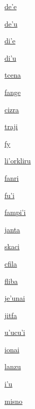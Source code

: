 {\hyperlink{val:dehe}{de'e}}{}{}{}

{\hyperlink{val:dehu}{de'u}}{}{}{}

{\hyperlink{val:dihe}{di'e}}{}{}{}

{\hyperlink{val:dihu}{di'u}}{}{}{}

{\hyperlink{val:tcena}{tcena}}{}{}{}

{\hyperlink{val:fange}{fange}}{}{}{}

{\hyperlink{val:cizra}{cizra}}{}{}{}

{\hyperlink{val:traji}{traji}}{}{}{}

{\hyperlink{val:fy}{fy}}{}{}{}

{\hyperlink{val:lihorkliru}{li'orkliru}}{}{}{}

{\hyperlink{val:fanri}{fanri}}{}{}{}

{\hyperlink{val:fuhi}{fu'i}}{}{}{}

{\hyperlink{val:fampihi}{fampi'i}}{}{}{}

{\hyperlink{val:janta}{janta}}{}{}{}

{\hyperlink{val:skaci}{skaci}}{}{}{}

{\hyperlink{val:cfila}{cfila}}{}{}{}

{\hyperlink{val:fliba}{fliba}}{}{}{}

{\hyperlink{val:jehunai}{je'unai}}{}{}{}

{\hyperlink{val:jitfa}{jitfa}}{}{}{}

{\hyperlink{val:uhucuhi}{u'ucu'i}}{}{}{}

{\hyperlink{val:ionai}{ionai}}{}{}{}

{\hyperlink{val:lanzu}{lanzu}}{}{}{}

{\hyperlink{val:ihu}{i'u}}{}{}{}

{\hyperlink{val:misno}{misno}}{}{}{}

